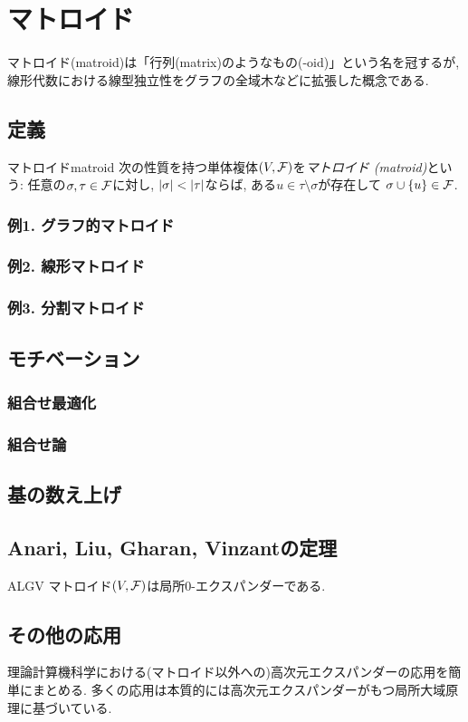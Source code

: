 \chapter{マトロイド} \label{chap:matroid}
マトロイド(matroid)は「行列(matrix)のようなもの(-oid)」という名を冠するが,
線形代数における線型独立性をグラフの全域木などに拡張した概念である.

\section{定義}
\begin{definition}{マトロイド}{matroid}
    次の性質を持つ単体複体$(V,\mathcal{F})$を\emph{マトロイド (matroid)}という:
    任意の$\sigma,\tau \in \mathcal{F}$に対し, $\lvert\sigma\rvert < \lvert\tau\rvert$ならば,
    ある$ u \in \tau \setminus \sigma$が存在して
    $\sigma \cup \lbrace u\rbrace \in \mathcal{F}$.
\end{definition}

\subsection{例1. グラフ的マトロイド}
\subsection{例2. 線形マトロイド}
\subsection{例3. 分割マトロイド}
\section{モチベーション}
\subsection{組合せ最適化}
\subsection{組合せ論}
\section{基の数え上げ}
\section{Anari, Liu, Gharan, Vinzantの定理}
\begin{lemma}{}{ALGV}
    マトロイド$(V,\mathcal{F})$は局所$0$-エクスパンダーである.
\end{lemma}
\section{その他の応用}
理論計算機科学における(マトロイド以外への)高次元エクスパンダーの応用を簡単にまとめる.
多くの応用は本質的には高次元エクスパンダーがもつ局所大域原理に基づいている.

